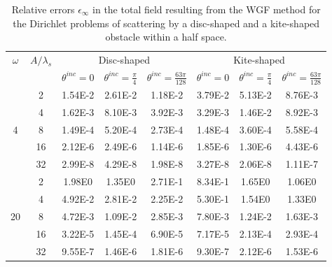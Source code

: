 \documentclass[10pt]{article}
\numberwithin{equation}{section}
\begin{document}
\begin{table}[htbp]
\centering
\begin{tabular}{|c|c|c|c|c|c|c|c|}
\hline
\multirow{2}{*}{$\omega$} & \multirow{2}{*}{$A/\lambda_s$} & \multicolumn{3}{|c|}{Disc-shaped}  & \multicolumn{3}{|c|}{Kite-shaped}\\
\cline{3-8}
& & $\theta^{inc}=0$ & $\theta^{inc}=\frac{\pi}{4}$ & $\theta^{inc}=\frac{63\pi}{128}$
& $\theta^{inc}=0$ & $\theta^{inc}=\frac{\pi}{4}$ & $\theta^{inc}=\frac{63\pi}{128}$  \\
\hline
  & 2  & 1.54E-2 & 2.61E-2 & 1.18E-2 & 3.79E-2 & 5.13E-2 & 8.76E-3 \\
  & 4  & 1.62E-3 & 8.10E-3 & 3.92E-3 & 3.29E-3 & 1.46E-2 & 8.92E-3 \\
4 & 8  & 1.49E-4 & 5.20E-4 & 2.73E-4 & 1.48E-4 & 3.60E-4 & 5.58E-4 \\
  & 16 & 2.12E-6 & 2.49E-6 & 1.14E-6 & 1.85E-6 & 1.30E-6 & 4.43E-6 \\
  & 32 & 2.99E-8 & 4.29E-8 & 1.98E-8 & 3.27E-8 & 2.06E-8 & 1.11E-7 \\
\hline
   & 2  & 1.98E0  & 1.35E0  & 2.71E-1 & 8.34E-1 & 1.65E0  & 1.06E0  \\
   & 4  & 4.92E-2 & 2.81E-2 & 2.25E-2 & 5.30E-1 & 1.54E0  & 1.33E0  \\
20 & 8  & 4.72E-3 & 1.09E-2 & 2.85E-3 & 7.80E-3 & 1.24E-2 & 1.63E-3 \\
   & 16 & 3.22E-5 & 1.45E-4 & 6.90E-5 & 7.17E-5 & 2.13E-4 & 2.93E-4 \\
   & 32 & 9.55E-7 & 1.46E-6 & 1.81E-6 & 9.30E-7 & 2.12E-6 & 1.53E-6 \\
\hline
\end{tabular}
\caption{Relative errors $\epsilon_\infty$ in the total field  resulting from the  WGF method for the Dirichlet problems of scattering by a disc-shaped and a kite-shaped obstacle within a half space.}
\label{Table2D.1}
\end{table}
\end{document}
